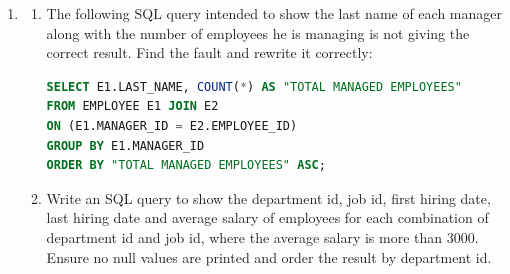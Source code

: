 \documentclass[12pt,a3paper]{article}
\begin{document}
\begin{enumerate}
\item 
\begin{enumerate}

\item  The following SQL query intended to show the last name of each manager along with the number of employees he is managing is not giving the correct result. Find the fault and rewrite it correctly:
\begin{lstlisting}[language=SQL]
SELECT E1.LAST_NAME, COUNT(*) AS "TOTAL MANAGED EMPLOYEES"
FROM EMPLOYEE E1 JOIN E2
ON (E1.MANAGER_ID = E2.EMPLOYEE_ID)
GROUP BY E1.MANAGER_ID
ORDER BY "TOTAL MANAGED EMPLOYEES" ASC;
\end{lstlisting}

\item  Write an SQL query to show the department id, job id, first hiring date, last hiring date and average salary of employees for each combination of department id and job id, where the average salary is more than 3000. Ensure no null values are printed and order the result by department id.

\end{enumerate}

\begin{center}
  
    \begin{tikzpicture}[
        >=Stealth,
        line width=0.6pt,
        table_box/.style={
            draw=borderblue,
            fill=white,
            rounded corners=2pt,
            thick,
            inner sep=8pt,
            font=\sffamily\small,
            align=left
        },
        join_label/.style={
            draw=borderblue!70,
            dashed,
            fill=labelbg,
            rounded corners=3pt,
            font=\sffamily\scriptsize,
            inner sep=3pt,
            align=center
        },
        rel_line/.style={
            draw=black!70,
            dashed,
            thick
        }
    ]



\end{tikzpicture}
\end{center}
\end{enumerate}
\end{document}
